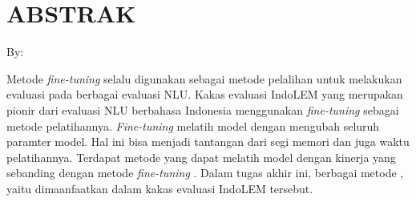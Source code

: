 \clearpage
\chapter*{ABSTRAK}

\begin{center}
    \center
    \begin{singlespace}
        \large\bfseries\MakeUppercase{\thetitle}
    
        \normalfont\normalsize
        By:
    
        \bfseries \theauthor
    \end{singlespace}
\end{center} 

\begin{singlespace}
    Metode \textit{fine-tuning}  selalu digunakan sebagai metode pelalihan untuk melakukan evaluasi pada berbagai evaluasi NLU. Kakas evaluasi IndoLEM yang merupakan pionir dari evaluasi NLU berbahasa Indonesia menggunakan \textit{fine-tuning} sebagai metode pelatihannya. \textit{Fine-tuning} melatih model dengan mengubah seluruh paramter model. Hal ini bisa menjadi tantangan dari segi memori dan juga waktu pelatihannya. Terdapat metode \PEFT yang dapat melatih model dengan kinerja yang sebanding dengan metode \textit{fine-tuning} . Dalam tugas akhir ini, berbagai metode \PEFT, yaitu \methodPEFT dimaanfaatkan dalam kakas evaluasi IndoLEM tersebut.
\end{singlespace}

\clearpage
